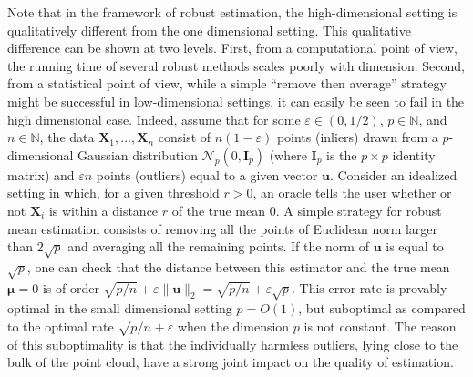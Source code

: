 \documentclass[aos,preprint,reqno]{imsart}
\newcommand\bmu{\boldsymbol\mu}
\newcommand\bX{\boldsymbol X}
\newcommand\bu{\boldsymbol u}
\newcommand\bfI{\mathbf I}
\theoremstyle{plain}
\theoremstyle{remark}
\begin{document}
    Note that in the framework of robust estimation, the 
    high-dimensional setting is qualitatively different 
    from the one dimensional setting. This qualitative
    difference can be shown at two levels. First, from a 
    computational point of view, the running time of several 
    robust methods scales poorly with dimension. Second, from 
    a statistical point of view, while a simple ``remove then 
    average'' strategy might be successful in low-dimensional 
    settings, it can easily be seen to fail in the high 
    dimensional case. Indeed, assume that for some $\varepsilon
    \in(0,1/2)$, $p\in\mathbb N$, and $n\in\mathbb N$, the 
    data $\bX_1,\ldots,\bX_n$ consist of $n(1-\varepsilon)$ points (inliers) drawn 
    from a $p$-dimensional Gaussian distribution $\mathcal N_p
    (0,\bfI_p)$ (where $\bfI_p$ is the $p\times p$ identity 
    matrix) and $\varepsilon n$ points (outliers) equal to a 
    given vector $\bu$. Consider an idealized setting in which, for a given threshold $r>0$, an oracle tells the user whether or not $\bX_i$ is within a distance $r$ of the true mean $0$. A simple strategy for robust mean 
    estimation consists of removing all the points of Euclidean 
    norm larger than $2\sqrt{p}$ and averaging all the remaining 
    points. If the norm of $\bu$ is equal to $\sqrt{p}$, one can 
    check that the distance between this estimator and the true 
    mean $\bmu = 0$ is of order 
    $\sqrt{p/n} + \varepsilon\|\bu\|_2 = \sqrt{p/n} + 
    \varepsilon\sqrt{p}$. This error rate is provably optimal
    in the small dimensional setting $p=O(1)$, but suboptimal
    as compared to the optimal rate $\sqrt{p/n} + \varepsilon$
    when the dimension $p$ is not constant. 
    The reason of this suboptimality is that the individually 
    harmless outliers, lying close to the bulk of the point cloud, have
    a strong joint impact on the quality of estimation. 
    
\end{document}
